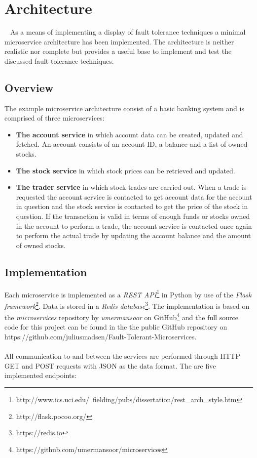 \section{Architecture}~\label{sec:architecture}
As a means of implementing a display of fault tolerance techniques a
minimal microservice architecture has been implemented. The
architecture is neither realistic nor complete but provides a useful
base to implement and test the discussed fault tolerance techniques.

\subsection{Overview}
The example microservice architecture consist of a basic banking
system and is comprised of three microservices:

\begin{itemize}
\item \textbf{The account service} in which account data can be
  created, updated and fetched. An account consists of an account ID,
  a balance and a list of owned stocks.
\item \textbf{The stock service} in which stock prices can be
  retrieved and updated.
\item \textbf{The trader service} in which stock trades are carried
  out. When a trade is requested the account service is contacted to
  get account data for the account in question  and the stock service
  is contacted to get the price of the stock in question. If the
  transaction is valid in terms of enough funds or stocks owned in the
  account to perform a trade, the account service is contacted once
  again to perform the actual trade by updating the account balance
  and the amount of owned stocks.
\end{itemize}

\subsection{Implementation}
Each microservice is implemented as a \textit{REST
API}\footnote{http://www.ics.uci.edu/~fielding/pubs/dissertation/rest\_arch\_style.htm}
in Python by use of the \textit{Flask
framework}\footnote{http://flask.pocoo.org/}. Data is stored in a \textit{Redis
database}\footnote{https://redis.io}. The implementation is based on
the \textit{microservices} repository by \textit{umermansoor} on
GitHub\footnote{https://github.com/umermansoor/microservices} and the
full source code for this project can be found in the the public
GitHub repository on
https://github.com/juliusmadsen/Fault-Tolerant-Microservices. 
\\\\
All communication to and between the services are performed through
HTTP GET and POST requests with JSON as the data format. The are five
implemented endpoints:


